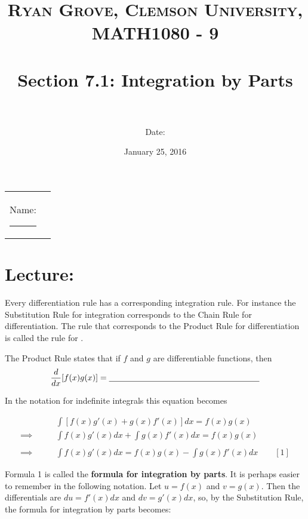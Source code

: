 \documentclass[paper=a4, fontsize=11pt]{scrartcl} %
\title{	
\normalfont \normalsize 
\textsc{Ryan Grove, Clemson University, MATH1080 - 9} \\ [25pt] %
\horrule{0.5pt} \\[0.4cm] %
\huge Section 7.1: Integration by Parts \\ %
\horrule{2pt} \\[0.5cm] %
}
\author{Date:} %
\date{\normalsize January 25, 2016} %
\numberwithin{equation}{section} %
\numberwithin{figure}{section} %
\numberwithin{table}{section} %
\newcommand{\ds}{\displaystyle}
\begin{document}
\maketitle %

\begin{flushleft}
\begin{tabular}{l l}
Name: \rule{3.2in}{.01cm}  & {}%
\end{tabular}
\end{flushleft}


\section*{\textbf{Lecture:}}

Every differentiation rule has a corresponding integration rule. For instance the Substitution Rule for integration corresponds to the Chain Rule for differentiation. The rule that corresponds to the Product Rule for differentiation is called the rule for \underline{\hspace{1.25in}} \underline{\hspace{0.4in}} \underline{\hspace{0.8in}}.\\
\indent

The Product Rule states that if $f$ and $g$ are differentiable functions, then\\

\[\ds\frac{d}{dx}[f(x)g(x)] = \underline{\hspace{2.5in}}\]
\indent

In the notation for indefinite integrals this equation becomes

\begin{align*}
&\ds\int [f(x)g'(x) + g(x)f'(x)]dx = f(x)g(x)\\
\implies \quad \quad &\ds\int f(x)g'(x)dx + \ds\int g(x)f'(x)dx = f(x)g(x)\\
\text{ } &\\
\implies \quad \quad &\boxed{\ds\int f(x)g'(x)dx = f(x)g(x) - \ds\int g(x)f'(x)dx} \quad \quad [1]
\end{align*}

Formula 1 is called the \textbf{formula for integration by parts}. It is perhaps easier to remember in the following notation. Let $u=f(x)$ and $v=g(x)$. Then the differentials are $du=f'(x)dx$ and $dv=g'(x)dx$, so, by the Substitution Rule, the formula for integration by parts becomes:
\end{document}
